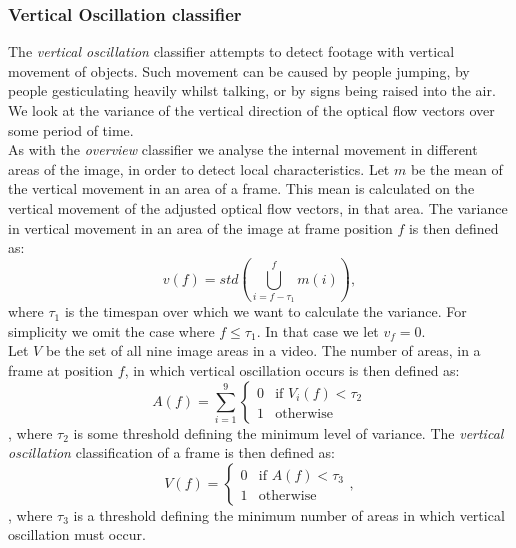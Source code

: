 \subsubsection{Vertical Oscillation classifier}\label{sec:verticaloscillationclassifier}
%
The \textit{vertical oscillation} classifier attempts to detect footage with vertical movement of objects. Such movement can be caused by people jumping, by people gesticulating heavily whilst talking, or by signs being raised into the air. We look at the variance of the vertical direction of the optical flow vectors over some period of time.\\
As with the \textit{overview} classifier we analyse the internal movement in different areas of the image, in order to detect local characteristics. Let $m$ be the mean of the vertical movement in an area of a frame. This mean is calculated on the vertical movement of the adjusted optical flow vectors, in that area. The variance in vertical movement in an area of the image at frame position $f$ is then defined as:
%
\begin{equation}
v(f) = std \left (\bigcup_{i=f-\tau_1}^{f} m(i) \right ),
\end{equation}
%
where $\tau_1$ is the timespan over which we want to calculate the variance. For simplicity we omit the case where $f \leq \tau_1$. In that case we let $v_{f} = 0$.\\
Let $V$ be the set of all nine image areas in a video. The number of areas, in a frame at position $f$, in which vertical oscillation occurs is then defined as:
%
\begin{equation}
A(f) = \sum_{i=1}^{9}
\begin{cases}
0 & \text{if } V_{i}(f) < \tau_2\\
1 &  \text{otherwise}
\end{cases}
\end{equation},
%
where $\tau_2$ is some threshold defining the minimum level of variance. The \textit{vertical oscillation} classification of a frame is then defined as:
%
\begin{equation}
V(f) =
\begin{cases}
0 & \text{if } A(f) < \tau_3\\
1 &  \text{otherwise}
\end{cases},
\end{equation},
%
where $\tau_3$ is a threshold defining the minimum number of areas in which vertical oscillation must occur.
%
%
